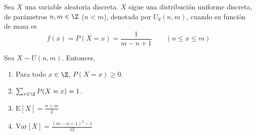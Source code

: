 \begin{Def}
  Sea $X$ una variable aleatoria discreta. $X$ sigue una distribución uniforme
  discreta, de parámetros $n,m\in\Z$ ($n < m$), denotada por $U_d(n,m)$,
  cuando su función de masa es
  \[f(x) = P(X=x) = \frac{1}{m-n+1}\qquad (n\leq x\leq m)\]
\end{Def}
\begin{Teo}
  Sea $X\sim U(n,m)$. Entonces,
  \begin{enumerate}
    \item Para todo $x\in\Z$, $P(X=x)\geq0$.
    \item $\sum_{x\in\Z}P(X=x) = 1$.
    \item $\text{E}[X] = \frac{n+m}{2}$
    \item $\text{Var}[X] = \frac{(m-n+1)^2-1}{12}$
  \end{enumerate}
\end{Teo}
